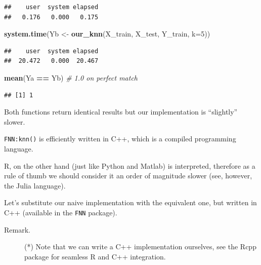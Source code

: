 \documentclass[10pt,b5paper,krantz1]{krantz}
\newenvironment{Shaded}{\begin{snugshade}}{\end{snugshade}}
\newcommand{\CommentTok}[1]{\textcolor[rgb]{0.37,0.37,0.37}{\textit{#1}}}
\newcommand{\ControlFlowTok}[1]{\textcolor[rgb]{0.27,0.27,0.27}{\textbf{#1}}}
\newcommand{\DataTypeTok}[1]{\textcolor[rgb]{0.27,0.27,0.27}{#1}}
\newcommand{\DecValTok}[1]{\textcolor[rgb]{0.06,0.06,0.06}{#1}}
\newcommand{\KeywordTok}[1]{\textcolor[rgb]{0.27,0.27,0.27}{\textbf{#1}}}
\newcommand{\NormalTok}[1]{#1}
\newcommand{\OperatorTok}[1]{\textcolor[rgb]{0.43,0.43,0.43}{\textbf{#1}}}
\newcommand{\StringTok}[1]{\textcolor[rgb]{0.5,0.5,0.5}{#1}}
\begin{document}
\begin{verbatim}
##    user  system elapsed 
##   0.176   0.000   0.175
\end{verbatim}

\begin{Shaded}
\begin{Highlighting}[]
\KeywordTok{system.time}\NormalTok{(Yb <-}\StringTok{ }\KeywordTok{our_knn}\NormalTok{(X_train, X_test, Y_train, }\DataTypeTok{k=}\DecValTok{5}\NormalTok{))}
\end{Highlighting}
\end{Shaded}

\begin{verbatim}
##    user  system elapsed 
##  20.472   0.000  20.467
\end{verbatim}

\begin{Shaded}
\begin{Highlighting}[]
\KeywordTok{mean}\NormalTok{(Ya }\OperatorTok{==}\StringTok{ }\NormalTok{Yb) }\CommentTok{# 1.0 on perfect match}
\end{Highlighting}
\end{Shaded}

\begin{verbatim}
## [1] 1
\end{verbatim}

Both functions return identical results but our implementation is ``slightly'' slower.

\texttt{FNN:knn()} is efficiently written in C++, which is a compiled programming language.

R, on the other hand (just like Python and Matlab) is interpreted, therefore
as a rule of thumb we should consider it an order of magnitude slower (see, however, the Julia language).

Let's substitute our naive implementation with the equivalent one,
but written in C++ (available in the \texttt{FNN} package).

\begin{description}
\item[Remark.]
(*) Note that we can write a C++ implementation ourselves,
see the Rcpp package for seamless R and C++ integration.
\end{description}

\begin{Shaded}
\end{Shaded}
\end{document}
